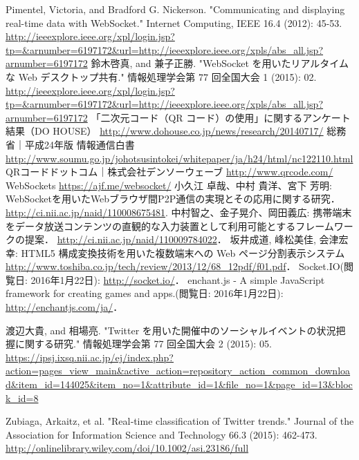 \begin{thebibliography}{99}
        Pimentel, Victoria, and Bradford G. Nickerson. "Communicating and displaying real-time data with WebSocket." Internet Computing, IEEE 16.4 (2012): 45-53.
        \url{http://ieeexplore.ieee.org/xpl/login.jsp?tp=&arnumber=6197172&url=http://ieeexplore.ieee.org/xpls/abs_all.jsp?arnumber=6197172}
        鈴木啓真, and 兼子正勝. "WebSocket を用いたリアルタイムな Web デスクトップ共有." 情報処理学会第 77 回全国大会 1 (2015): 02.
        \url{http://ieeexplore.ieee.org/xpl/login.jsp?tp=&arnumber=6197172&url=http://ieeexplore.ieee.org/xpls/abs_all.jsp?arnumber=6197172}
        「二次元コード（QR コード）の使用」に関するアンケート結果（DO HOUSE）
        \url{http://www.dohouse.co.jp/news/research/20140717/}
        総務省｜平成24年版 情報通信白書
        \url{http://www.soumu.go.jp/johotsusintokei/whitepaper/ja/h24/html/nc122110.html}
        QRコードドットコム｜株式会社デンソーウェーブ
        \url{http://www.qrcode.com/}
        WebSockets
        \url{https://ajf.me/websocket/}
        小久江 卓哉、中村 貴洋、宮下 芳明:
        WebSocketを用いたWebブラウザ間P2P通信の実現とその応用に関する研究．
        \url{http://ci.nii.ac.jp/naid/110008675481}.
        中村智之、金子晃介、岡田義広:
        携帯端末をデータ放送コンテンツの直観的な入力装置として利用可能とするフレームワークの提案．
        \url{http://ci.nii.ac.jp/naid/110009784022}．
        坂井成道, 峰松美佳, 会津宏幸:
        HTML5 構成変換技術を用いた複数端末への Web ページ分割表示システム
        \url{http://www.toshiba.co.jp/tech/review/2013/12/68_12pdf/f01.pdf}．
        Socket.IO(閲覧日: 2016年1月22日):
        \url{http://socket.io/}．
        enchant.js - A simple JavaScript framework for creating games and apps.(閲覧日: 2016年1月22日):
        \url{http://enchantjs.com/ja/}．

        渡辺大貴, and 相場亮. "Twitter を用いた開催中のソーシャルイベントの状況把握に関する研究." 情報処理学会第 77 回全国大会 2 (2015): 05.
        \url{https://ipsj.ixsq.nii.ac.jp/ej/index.php?action=pages_view_main&active_action=repository_action_common_download&item_id=144025&item_no=1&attribute_id=1&file_no=1&page_id=13&block_id=8}

        Zubiaga, Arkaitz, et al. "Real‐time classification of Twitter trends." Journal of the Association for Information Science and Technology 66.3 (2015): 462-473.
        \url{http://onlinelibrary.wiley.com/doi/10.1002/asi.23186/full}


\end{thebibliography}
